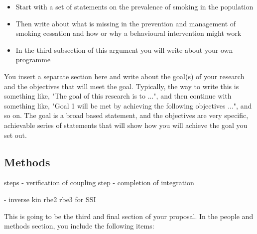 \documentclass[a4paper]{article}
\begin{document}
\begin{itemize}
\item Start with a set of statements on the prevalence of smoking in the population
\item Then write about what is missing in the prevention and management of smoking cessation and how or why a behavioural intervention might work
\item In the third subsection of this argument you will write about your own programme
\end{itemize}












You insert a separate section here and write about the goal(s) of your research and the objectives that will meet the goal. Typically, the way to write this is something like, "The goal of this research is to ...", and then continue with something like, "Goal 1 will be met by achieving the following objectives ...", and so on. The goal is a broad based statement, and the objectives are very specific, achievable series of statements that will show how you will achieve the goal you set out. 




\subsection*{Methods}


steps
- verification of coupling step
- completion of integration


- inverse kin rbe2 rbe3 for SSI





This is going to be the third and final section of your proposal. In the people and methods section, you include the following items:
\end{document}
